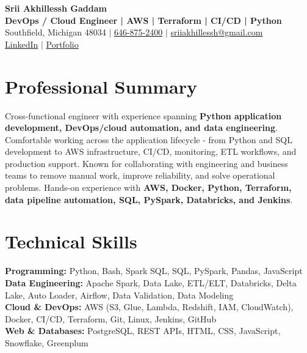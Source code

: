 \documentclass[letterpaper,10pt]{article}
\begin{document}
\fontsize{9.35pt}{10.45pt}\selectfont

\begin{center}
    {\LARGE \textbf{Srii Akhillessh Gaddam}} \\[-1pt]
    \textbf{DevOps / Cloud Engineer | AWS | Terraform | CI/CD | Python} \\[2pt]
    Southfield, Michigan 48034 $|$
    \href{tel:6468752400}{646-875-2400} $|$
    \href{mailto:sriiakhillessh@gmail.com}{sriiakhillessh@gmail.com} \\[1pt]
    \href{https://www.linkedin.com/in/srii-akhiilessh-gaddam-b48668191/}{LinkedIn} $|$
    \href{https://sriiakhillesshg.github.io/portfolio/}{Portfolio}
\end{center}
\vspace{-8pt}

\section{Professional Summary}
\small{Cross-functional engineer with experience spanning \textbf{Python application development, DevOps/cloud automation, and data engineering}. Comfortable working across the application lifecycle - from Python and SQL development to AWS infrastructure, CI/CD, monitoring, ETL workflows, and production support. Known for collaborating with engineering and business teams to remove manual work, improve reliability, and solve operational problems. Hands-on experience with \textbf{AWS, Docker, Python, Terraform, data pipeline automation, SQL, PySpark, Databricks, and Jenkins}.}

\section{Technical Skills}
\small{
\textbf{Programming:} Python, Bash, Spark SQL, SQL, PySpark, Pandas, JavaScript \\
\textbf{Data Engineering:} Apache Spark, Data Lake, ETL/ELT, Databricks, Delta Lake, Auto Loader, Airflow, Data Validation, Data Modeling \\
\textbf{Cloud \& DevOps:} AWS (S3, Glue, Lambda, Redshift, IAM, CloudWatch), Docker, CI/CD, Terraform, Git, Linux, Jenkins, GitHub \\
\textbf{Web \& Databases:} PostgreSQL, REST APIs, HTML, CSS, JavaScript, Snowflake, Greenplum
}
\end{document}
